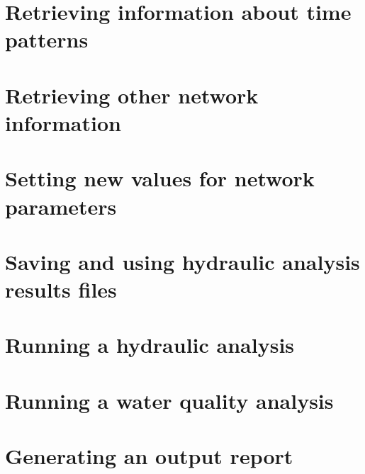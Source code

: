 \section{Retrieving information about time patterns}
 
 
 
 

\section{Retrieving other network information}
 
 
 
 
 
\section{Setting new values for network parameters} 
 
 
 
 
 
 
 
 
 

\section{Saving and using hydraulic analysis results files} 
 
 
 
\section{Running a hydraulic analysis} 
 
 
 
 
 
 
 
\section{Running a water quality analysis} 
 
 
 
 
 
 
 
 
\section{Generating an output report} 
 
 
 
 
 
 
 
 